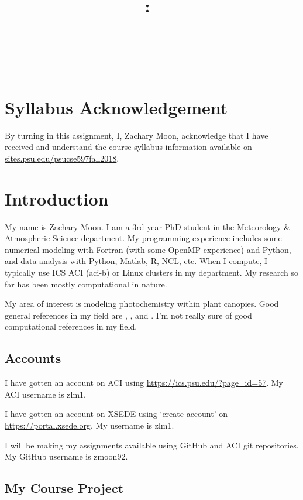 \documentclass{article}
\title{\vspace{2in}\textmd{\textbf{\hmwkClass:\ \hmwkTitle}}\\\normalsize\vspace{0.1in}\small{\hmwkDueDate}\\\vspace{0.1in}\large{\textit{\hmwkClassInstructor\ \hmwkClassTime}}\vspace{3in}}
\date{}
\author{\textbf{\hmwkAuthorNameb} } %
\begin{document}
\begin{spacing}{1.1}
\maketitle

\newpage
\section{Syllabus Acknowledgement}

By turning in this assignment, I, Zachary Moon, acknowledge that I have received and understand the course syllabus information available on \url{sites.psu.edu/psucse597fall2018}. 

\section{Introduction}

My name is Zachary Moon.  I am a 3rd year PhD student in the Meteorology \& Atmospheric Science department. My programming experience includes some numerical modeling with Fortran (with some OpenMP experience) and Python, and data analysis with Python, Matlab, R, NCL, etc.  When I compute, I typically use ICS ACI (aci-b) or Linux clusters in my department.  My research so far has been mostly computational in nature. 

My area of interest is modeling photochemistry within plant canopies. Good general references in my field are \citet{fuentes_biogenic_2000}, \citet{dickinson_land_1983}, and \citet{myneni_review_1989}. I'm not really sure of good computational references in my field. 


\subsection{Accounts}

I have gotten an account on ACI using \url{https://ics.psu.edu/?page_id=57}. My ACI username is zlm1.

I have gotten an account on XSEDE using `create account' on \url{https://portal.xsede.org}. 
My username is zlm1.

I will be making my assignments available using GitHub and ACI git repositories. My GitHub username is zmoon92. 

\subsection{My Course Project}


\end{spacing}
\end{document}
